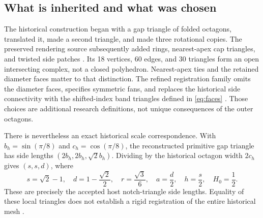 \documentclass[11pt,a4paper]{article}
\numberwithin{equation}{section}
\begin{document}
\subsection{What is inherited and what was chosen}
The historical construction began with a gap triangle of folded octagons,
translated it, made a second triangle, and made three rotational copies.
The preserved rendering source subsequently added rings, nearest-apex cap
triangles, and twisted side patches \cite{History}. Its 18 vertices, 60 edges,
and 30 triangles form an open intersecting complex, not a closed polyhedron.
Nearest-apex ties and the retained diameter faces matter to that distinction.
The refined registration family omits the diameter faces, specifies symmetric
fans, and replaces the historical side connectivity with the shifted-index
band triangles defined in \eqref{eq:faces} \cite{Registration}.
Those choices are additional research definitions, not
unique consequences of the outer octagons.

There is nevertheless an exact historical scale correspondence. With
$b_h=\sin(\pi/8)$ and $c_h=\cos(\pi/8)$, the reconstructed primitive gap
triangle has side lengths $(2b_h,2b_h,\sqrt2 b_h)$. Dividing by the historical
octagon width $2c_h$ gives $(s,s,d)$, where
\begin{equation}\label{eq:constants}
s=\sqrt2-1,\quad d=1-\frac{\sqrt2}{2},\quad
r=\frac{\sqrt3}{6},\quad a=\frac d2,\quad h=\frac s2,\quad H_0=\frac12.
\end{equation}
These are precisely the accepted host notch-triangle side lengths. Equality of
these local triangles does not establish a rigid registration of the entire
historical mesh \cite[Parts A and C]{R0}.
\end{document}
